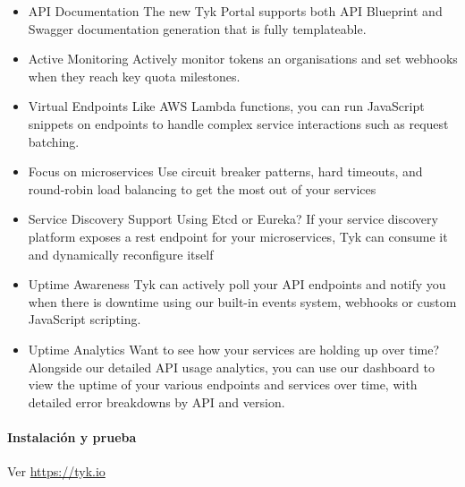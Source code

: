 \begin{itemize}
  \item API Documentation The new Tyk Portal supports both API Blueprint and Swagger documentation generation that is fully templateable.
  \item Active Monitoring Actively monitor tokens an organisations and set webhooks when they reach key quota milestones.
  \item Virtual Endpoints Like AWS Lambda functions, you can run JavaScript snippets on endpoints to handle complex service interactions such as request batching.
  \item Focus on microservices Use circuit breaker patterns, hard timeouts, and round-robin load balancing to get the most out of your services
  \item Service Discovery Support Using Etcd or Eureka? If your service discovery platform exposes a rest endpoint for your microservices, Tyk can consume it and dynamically reconfigure itself
  \item Uptime Awareness Tyk can actively poll your API endpoints and notify you when there is downtime using our built-in events system, webhooks or custom JavaScript scripting.
  \item Uptime Analytics Want to see how your services are holding up over time? Alongside our detailed API usage analytics, you can use our dashboard to view the uptime of your various endpoints and services over time, with detailed error breakdowns by API and version.
\end{itemize}

\paragraph{Instalación y prueba}

Ver \url{https://tyk.io}

